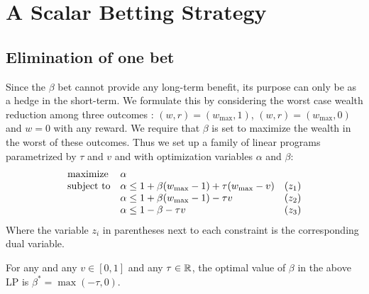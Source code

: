 \section{A Scalar Betting Strategy}
\subsection{Elimination of one bet} \label{app:betaopt}
Since the $\beta$ bet cannot provide any long-term benefit, its purpose can only be as a hedge in the short-term. We formulate this by considering the
worst case wealth reduction among three outcomes :
$(w,r)=(w_{\max},1)$, 
$(w,r)=(w_{\max},0)$ and $w=0$ with any reward. We require that $\beta$
is set to maximize the wealth in the worst of these outcomes. Thus we set 
up a family of linear programs parametrized by $\tau$ and $v$ and with optimization variables $\alpha$ and $\beta$:
\begin{equation*}
\begin{array}{ll@{}ll}
\text{maximize}  & \alpha &\\
\text{subject to}& \alpha \leq 1+\beta(w_{\max}-1)+\tau(w_{\max}-v)  & &(z_1) \\
                 & \alpha \leq 1+\beta(w_{\max}-1)-\tau v            & &(z_2) \\
                 & \alpha \leq 1-\beta-\tau v                        & &(z_3) \\
\end{array}
\end{equation*}
Where the variable $z_i$ in parentheses next to each constraint is the corresponding dual variable. 
\begin{theorem}
For any  and any $v\in [0,1]$ and any $\tau \in \mathbb{R}$, the optimal value of $\beta$ in the above LP is $\beta^*=\max(-\tau,0)$.
\end{theorem}

